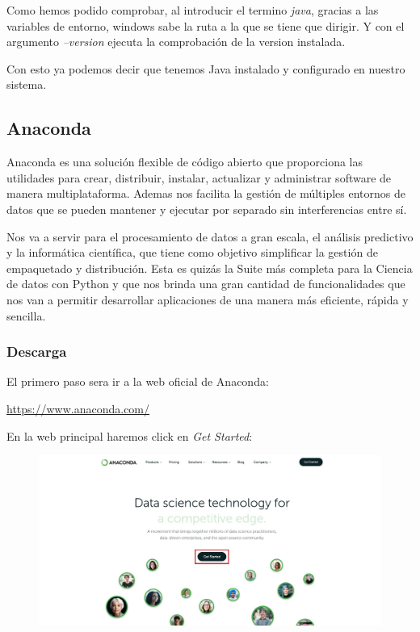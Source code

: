 \documentclass[a4paper,10pt]{article}
\begin{document}
Como hemos podido comprobar, al introducir el termino \textit{java}, gracias a las variables de entorno, windows sabe la ruta a la que se tiene que dirigir. Y con el argumento \textit{--version} ejecuta la comprobación de la version instalada.

Con esto ya podemos decir que tenemos Java instalado y configurado en nuestro sistema. 

\clearpage

\subsection{Anaconda}

Anaconda es una solución flexible de código abierto que proporciona las utilidades para crear, distribuir, instalar, actualizar y administrar software de manera multiplataforma. Ademas nos facilita la gestión de múltiples entornos de datos que se pueden mantener y ejecutar por separado sin interferencias entre sí.
 
Nos va a servir para el procesamiento de datos a gran escala, el análisis predictivo y la informática científica, que tiene como objetivo simplificar la gestión de empaquetado y distribución. Esta es quizás la Suite más completa para la Ciencia de datos con Python y que nos brinda una gran cantidad de funcionalidades que nos van a permitir desarrollar aplicaciones de una manera más eficiente, rápida y sencilla. 


\subsubsection{Descarga}

El primero paso sera ir a la web oficial de Anaconda:
\begin{center}
\href{https://www.anaconda.com/}{https://www.anaconda.com/} 
\end{center}
En la web principal haremos click en \textit{Get Started}:

\begin{figure}[H]
\begin{center}
\includegraphics[width=450pt]{./fotos/introduccion/web anaconda.jpg}
\end{center}
\end{figure}
\end{document}
